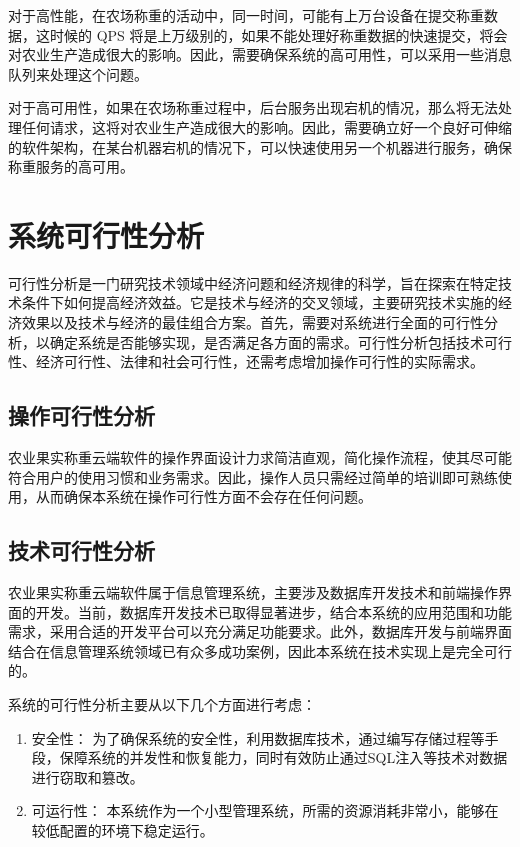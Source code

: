 对于高性能，在农场称重的活动中，同一时间，可能有上万台设备在提交称重数据，这时候的 QPS 将是上万级别的，如果不能处理好称重数据的快速提交，将会对农业生产造成很大的影响。因此，需要确保系统的高可用性，可以采用一些消息队列来处理这个问题。

对于高可用性，如果在农场称重过程中，后台服务出现宕机的情况，那么将无法处理任何请求，这将对农业生产造成很大的影响。因此，需要确立好一个良好可伸缩的软件架构，在某台机器宕机的情况下，可以快速使用另一个机器进行服务，确保称重服务的高可用。

\section{系统可行性分析}

可行性分析是一门研究技术领域中经济问题和经济规律的科学，旨在探索在特定技术条件下如何提高经济效益。它是技术与经济的交叉领域，主要研究技术实施的经济效果以及技术与经济的最佳组合方案。首先，需要对系统进行全面的可行性分析，以确定系统是否能够实现，是否满足各方面的需求。可行性分析包括技术可行性、经济可行性、法律和社会可行性，还需考虑增加操作可行性的实际需求。

\subsection{操作可行性分析}

农业果实称重云端软件的操作界面设计力求简洁直观，简化操作流程，使其尽可能符合用户的使用习惯和业务需求。因此，操作人员只需经过简单的培训即可熟练使用，从而确保本系统在操作可行性方面不会存在任何问题。

\subsection{技术可行性分析}

农业果实称重云端软件属于信息管理系统，主要涉及数据库开发技术和前端操作界面的开发。当前，数据库开发技术已取得显著进步，结合本系统的应用范围和功能需求，采用合适的开发平台可以充分满足功能要求。此外，数据库开发与前端界面结合在信息管理系统领域已有众多成功案例，因此本系统在技术实现上是完全可行的。

系统的可行性分析主要从以下几个方面进行考虑：
	
\begin{enumerate}
    \item 安全性：
    为了确保系统的安全性，利用数据库技术，通过编写存储过程等手段，保障系统的并发性和恢复能力，同时有效防止通过SQL注入等技术对数据进行窃取和篡改。
    \item 可运行性：
    本系统作为一个小型管理系统，所需的资源消耗非常小，能够在较低配置的环境下稳定运行。
\end{enumerate}

